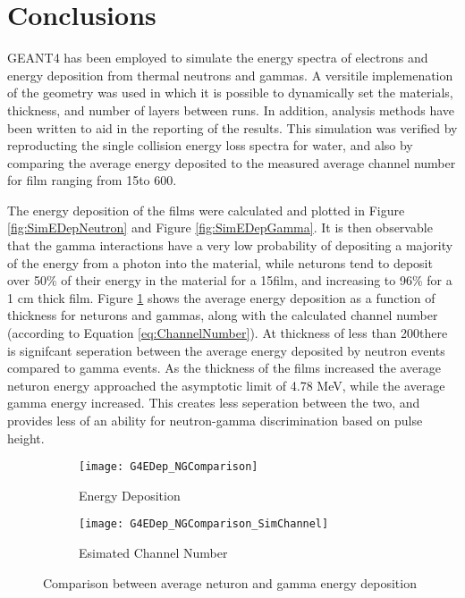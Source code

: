\section{Conclusions}
\label{sec:Conclusions}

GEANT4 has been employed to simulate the energy spectra of electrons and energy deposition from thermal neutrons and  gammas.
A versitile implemenation of the geometry was used in which it is possible to dynamically set the materials, thickness, and number of layers between runs.
In addition, analysis methods have been written to aid in the reporting of the results.
This simulation was verified by reproducting the single collision energy loss spectra for water, and also by comparing the average energy deposited to the measured average channel number for film ranging from 15\micron to 600\micron. 

The energy deposition of the films were calculated and plotted in Figure \ref{fig:SimEDepNeutron} and Figure \ref{fig:SimEDepGamma}. 
It is then observable that the gamma interactions have a very low probability of depositing a majority of the energy from a  photon into the material, while neturons tend to deposit over 50\% of their energy in the material for a 15\micron film, and increasing to 96\% for a 1 cm thick film.
Figure \ref{fig:EDepComparison} shows the average energy deposition as a function of thickness for neturons and gammas, along with the calculated channel number (according to Equation \ref{eq:ChannelNumber}).
At thickness of less than 200\micron there is signifcant seperation between the average energy deposited by neutron events compared to gamma events.
As the thickness of the films increased the average neturon energy approached the asymptotic limit of 4.78 MeV, while the average gamma energy increased. 
This creates less seperation between the two, and provides less of an ability for neutron-gamma discrimination based on pulse height.
\begin{figure}[h]
    \centering
    \begin{subfigure}[b]{0.45\figurewidth}
        \texttt{[image: G4EDep\_NGComparison]}
        \caption{Energy Deposition}
    \end{subfigure}
    \begin{subfigure}[b]{0.45\figurewidth}
        \texttt{[image: G4EDep\_NGComparison\_SimChannel]}
        \caption{Esimated Channel Number}
    \end{subfigure}
    \caption{Comparison between average neturon and gamma energy deposition}
    \label{fig:EDepComparison}
\end{figure}
